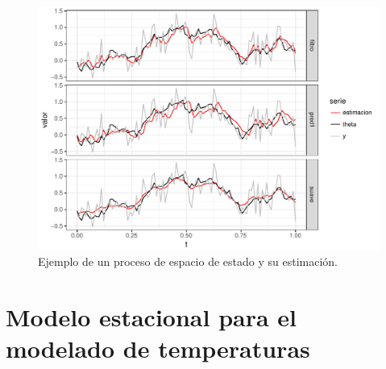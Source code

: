 \documentclass[12pt]{article}\usepackage[]{graphicx}\usepackage[]{color}
\makeatletter
\def\maxwidth{ %
  \ifdim\Gin@nat@width>\linewidth
    \linewidth
  \else
    \Gin@nat@width
  \fi
}
\newenvironment{knitrout}{}{} %
\makeatother
\begin{document}
\begin{knitrout}
\color{fgcolor}\begin{figure}

{\centering \includegraphics[width=\maxwidth]{figure/graf7b-1} 

}

\caption[Ejemplo de un proceso de espacio de estado y su estimación]{Ejemplo de un proceso de espacio de estado y su estimación.}\label{fig:graf7b}
\end{figure}


\end{knitrout}



\newcommand{\thetaline}{\raisebox{2pt}{\tikz{\draw[-,theta,-,line width = 0.9pt](0,0) -- (5mm,0); }}\;}
\newcommand{\yeline}{\raisebox{2pt}{\tikz{\draw[-,ye,-,line width = 0.9pt](0,0) -- (5mm,0); }}\;}





\section{Modelo estacional para el modelado de temperaturas}\label{DLMtemp}
\end{document}

